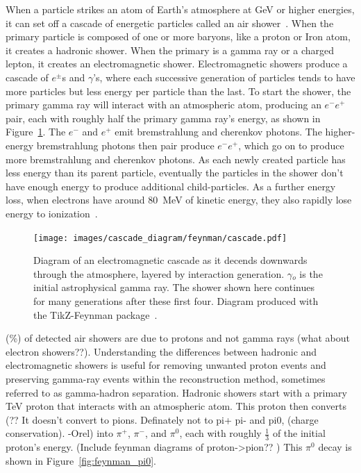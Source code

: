   When a particle strikes an atom of Earth's atmosphere at GeV or higher energies, it can set off a cascade of energetic particles called an air shower~\cite{Bethe1934,Klein1999}.
  When the primary particle is composed of one or more baryons, like a proton or Iron atom, it creates a hadronic shower.
  When the primary is a gamma ray or a charged lepton, it creates an electromagnetic shower.
  Electromagnetic showers produce a cascade of $e^{\pm}$s and $\gamma$'s, where each successive generation of particles tends to have more particles but less energy per particle than the last.
  To start the shower, the primary gamma ray will interact with an atmospheric atom, producing an $e^{-}e^{+}$ pair, each with roughly half the primary gamma ray's energy, as shown in Figure~\ref{fig:emcascade}.
  The $e^{-}$ and $e^{+}$ emit bremstrahlung and cherenkov photons.
  The higher-energy bremstrahlung photons then pair produce $e^{-}e^{+}$, which go on to produce more bremstrahlung and cherenkov photons.
  As each newly created particle has less energy than its parent particle, eventually the particles in the shower don't have enough energy to produce additional child-particles.
  As a further energy loss, when electrons have around \SI{80}{MeV} of kinetic energy, they also rapidly lose energy to ionization~\cite{pdg_2014}.

  \begin{figure}[ht]
    \centering
    \texttt{[image: images/cascade\_diagram/feynman/cascade.pdf]}
    \caption[Electromagnetic Cascade]{
      Diagram of an electromagnetic cascade as it decends downwards through the atmosphere, layered by interaction generation.
      $\gamma{}_o$ is the initial astrophysical gamma ray.
      The shower shown here continues for many generations after these first four.
      Diagram produced with the TikZ-Feynman package~\cite{ellis2017tikz}.
      \CaptionBlankLine
    }
    \label{fig:emcascade}
  \end{figure}

  (\%) of detected air showers are due to {\color{red}protons and not gamma rays (what about electron showers??)}.
  Understanding the differences between hadronic and electromagnetic showers is useful for removing unwanted proton events and preserving gamma-ray events within the reconstruction method, sometimes referred to as gamma-hadron separation.
  Hadronic showers start with a primary \nicetilde TeV proton that interacts with an atmospheric atom.
  {\color{red}This proton then converts (?? It doesn't convert to pions. Definately not to pi+ pi- and pi0, (charge conservation). -Orel)} into $\pi^{+}$, $\pi^{-}$, and $\pi^{0}$, each with roughly \nicetilde $\frac{1}{3}$ of the initial proton's energy.
  {\color{red}(Include feynman diagrams of proton->pion?? )}
  This $\pi^{0}$ decay is shown in Figure~\ref{fig:feynman_pi0}.
  
